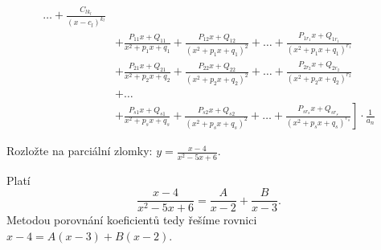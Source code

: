 \begin{veta}
\begin{align*}
              \dots + \frac{C_{lk_l}}{(x-c_l)^{k_l}} \\
          & + \frac{P_{11}x + Q_{11}}{x^2 + p_1x + q_1}
              + \frac{P_{12}x + Q_{12}}{(x^2 + p_1x + q_1)^2} + \dots
              + \frac{P_{1r_1}x + Q_{1r_1}}{(x^2 + p_1x + q_1)^{r_1}} \\
          & + \frac{P_{21}x + Q_{21}}{x^2 + p_2x + q_2}
              + \frac{P_{22}x + Q_{22}}{(x^2 + p_2x + q_2)^2} + \dots
              + \frac{P_{2r_2}x + Q_{2r_2}}{(x^2 + p_2x + q_2)^{r_2}} \\
          & + \dots \\
          & + \left . \frac{P_{s1}x + Q_{s1}}{x^2 + p_sx + q_s}
              + \frac{P_{s2}x + Q_{s2}}{(x^2 + p_sx + q_s)^2} + \dots
              + \frac{P_{sr_s}x + Q_{sr_s}}{(x^2 + p_sx + q_s)^{r_s}} \right ]
              \cdot \frac{1}{a_n}
    \end{align*}
\end{veta}

\begin{priklad}
Rozložte na parciální zlomky: $y=\frac{x-4}{x^2-5x+6}.$
\end{priklad}

\begin{reseni}
Platí
$$\frac{x-4}{x^2-5x+6}=\frac{A}{x-2}+\frac{B}{x-3}.$$
Metodou porovnání koeficientů tedy řešíme rovnici $x-4=A(x-3)+B(x-2)$.
\end{reseni}
